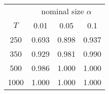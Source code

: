 % 
\begin{tabular}{cccc}
  \hline
  & \multicolumn{3}{c}{nominal size $\alpha$} \\
 $T$ & 0.01 & 0.05 & 0.1 \\
 \hline
250 & 0.693 & 0.898 & 0.937 \\ 
  350 & 0.929 & 0.981 & 0.990 \\ 
  500 & 0.986 & 1.000 & 1.000 \\ 
  1000 & 1.000 & 1.000 & 1.000 \\ 
   \hline
\end{tabular}
